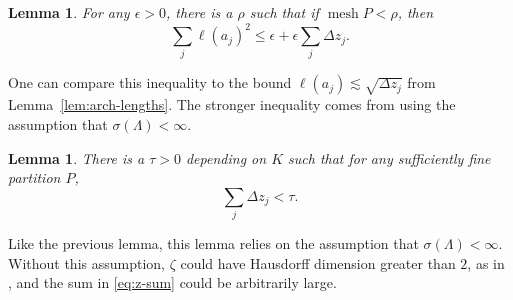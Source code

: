 \documentclass[12pt,reqno]{amsart}
\DeclareMathOperator{\mesh}{mesh}
\newtheorem{lemma}[thm]{Lemma}
\theoremstyle{remark}
\newcommand{\0}{\mathbf{0}}
\renewcommand{\1}{\mathbf 1}
\begin{document}
\begin{lemma}\label{lem:arch-area}
  For any $\epsilon>0$, there is a $\rho$ such that if $\mesh P<\rho$, then
  \begin{equation}\label{eq:arch-area}
    \sum_j \ell(a_j)^2 \le \epsilon + \epsilon \sum_j \Delta z_j.
  \end{equation}
\end{lemma}
One can compare this inequality to the bound $\ell(a_j)\lesssim \sqrt{\Delta z_j}$ from Lemma~\ref{lem:arch-lengths}. The stronger inequality comes from using the assumption that $\sigma(\Lambda)<\infty$.

\begin{lemma}\label{lem:z-sum}
  There is a $\tau >0$ depending on $K$ such that for any sufficiently fine partition $P$, 
  \begin{equation}\label{eq:z-sum}
    \sum_j \Delta z_j < \tau.
  \end{equation}
\end{lemma}

Like the previous lemma, this lemma relies on the assumption that $\sigma(\Lambda)<\infty$. Without this assumption, $\zeta$ could have Hausdorff dimension greater than $2$, as in \cite{AY-Vertical}, and the sum in \eqref{eq:z-sum} could be arbitrarily large. 
\end{document}
